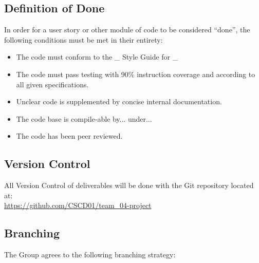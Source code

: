 \documentclass[a4paper,12pt]{article} %
\begin{document}
\subsection{Definition of Done}

In order for a user story or other module of code to be considered ``done'', the following conditions must be met in their entirety:
\begin{itemize}
\item The code must conform to the _ Style Guide for _
\item The code must pass testing with 90\% instruction coverage and according to all given specifications.
\item Unclear code is supplemented by concise internal documentation.
\item The code base is compile-able by... under...
\item The code has been peer reviewed.
\end{itemize}

\subsection{Version Control}

All Version Control of deliverables will be done with the Git repository located at: \\
\url{https://github.com/CSCD01/team_04-project}


\subsection{Branching}

The Group agrees to the following branching strategy:
\end{document}
